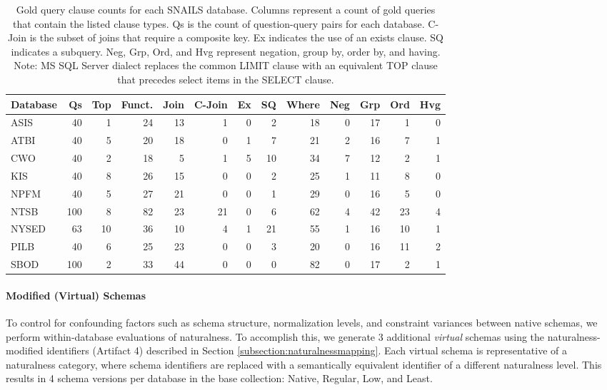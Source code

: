 \begin{table}[!h]
  \centering
  \begin{tabular}{lrrrrrrrrrrrr}
\toprule
Database & Qs & Top & Funct. & Join & C-Join & Ex & SQ & Where & Neg & Grp & Ord & Hvg \\
\midrule
ASIS & 40 & 1 & 24 & 13 & 1 & 0 & 2 & 18 & 0 & 17 & 1 & 0 \\
ATBI & 40 & 5 & 20 & 18 & 0 & 1 & 7 & 21 & 2 & 16 & 7 & 1 \\
CWO & 40 & 2 & 18 & 5 & 1 & 5 & 10 & 34 & 7 & 12 & 2 & 1 \\
KIS & 40 & 8 & 26 & 15 & 0 & 0 & 2 & 25 & 1 & 11 & 8 & 0 \\
NPFM & 40 & 5 & 27 & 21 & 0 & 0 & 1 & 29 & 0 & 16 & 5 & 0 \\
NTSB & 100 & 8 & 82 & 23 & 21 & 0 & 6 & 62 & 4 & 42 & 23 & 4 \\
NYSED & 63 & 10 & 36 & 10 & 4 & 1 & 21 & 55 & 1 & 16 & 10 & 1 \\
PILB & 40 & 6 & 25 & 23 & 0 & 0 & 3 & 20 & 0 & 16 & 11 & 2 \\
SBOD & 100 & 2 & 33 & 44 & 0 & 0 & 0 & 82 & 0 & 17 & 2 & 1 \\
\bottomrule
\end{tabular}

  \caption{Gold query clause counts for each SNAILS database. Columns represent a count of gold queries that contain the listed clause types. Qs is the count of question-query pairs for each database. C-Join is the subset of joins that require a composite key. Ex indicates the use of an exists clause. SQ indicates a subquery. Neg, Grp, Ord, and Hvg represent negation, group by, order by, and having. Note: MS SQL Server dialect replaces the common LIMIT clause with an equivalent TOP clause that precedes select items in the SELECT clause.}
  \label{table:query-stats}
\end{table}

\paragraph{\textbf{Modified (Virtual) Schemas}}
To control for confounding factors such as schema structure, normalization levels, and constraint variances between native schemas, we perform within-database evaluations of naturalness.
To accomplish this, we generate 3 additional \emph{virtual} schemas using the naturalness-modified identifiers (Artifact 4) described in Section \ref{subsection:naturalnessmapping}.
Each virtual schema is representative of a naturalness category, where schema identifiers are replaced with a semantically equivalent identifier of a different naturalness level.
This results in 4 schema versions per database in the base collection: Native, Regular, Low, and Least.

